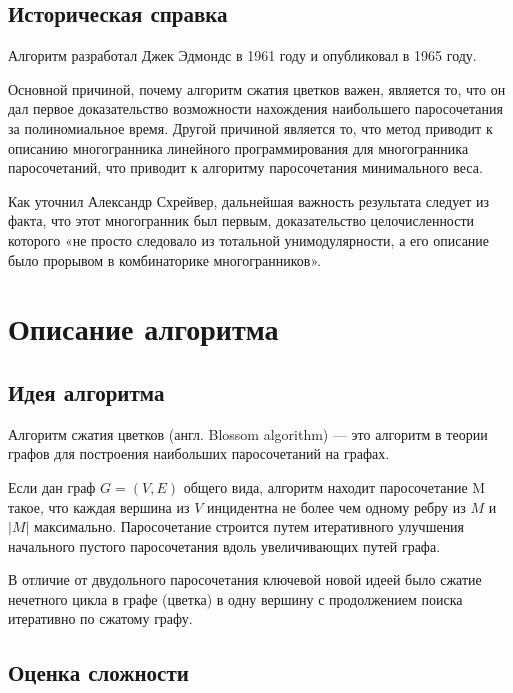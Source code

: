 \documentclass[14pt, a4paper]{extarticle}
\begin{document}
    \subsection*{Историческая справка}
   
    Алгоритм разработал Джек Эдмондс в 1961 году и опубликовал в 1965 году. 
    
    Основной причиной, почему алгоритм сжатия цветков важен, является то, что он дал первое доказательство возможности нахождения наибольшего паросочетания за полиномиальное время. Другой причиной является то, что метод приводит к описанию многогранника линейного программирования для многогранника паросочетаний, что приводит к алгоритму паросочетания минимального веса. 
    
    Как уточнил Александр Схрейвер, дальнейшая важность результата следует из факта, что этот многогранник был первым, доказательство целочисленности которого «не просто следовало из тотальной унимодулярности, а его описание было прорывом в комбинаторике многогранников».

    \pagebreak
    
    \section*{Описание алгоритма}

    \subsection*{Идея алгоритма}
    
    Алгоритм сжатия цветков (англ. Blossom algorithm) — это алгоритм в теории графов для построения наибольших паросочетаний на графах.
    
    Если дан граф $G=(V, E)$ общего вида, алгоритм находит паросочетание M такое, что каждая вершина из $V$ инцидентна не более чем одному ребру из $M$ и $|M|$ максимально. Паросочетание строится путем итеративного улучшения начального пустого паросочетания вдоль увеличивающих путей графа. 
    
    В отличие от двудольного паросочетания ключевой новой идеей было сжатие нечетного цикла в графе (цветка) в одну вершину с продолжением поиска итеративно по сжатому графу.

    \subsection*{Оценка сложности}
\end{document}

